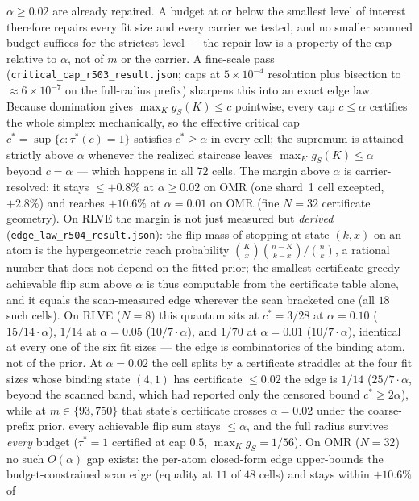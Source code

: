 \documentclass{article}
\theoremstyle{definition}
\theoremstyle{remark}
\begin{document}
$\alpha\ge0.02$ are already repaired. A budget at or below the
smallest level of interest therefore repairs every fit size and
every carrier we tested, and no smaller scanned budget suffices for
the strictest level --- the repair law is a property of the cap
relative to $\alpha$, not of $m$ or the carrier. A fine-scale pass
(\texttt{critical\_cap\_r503\_result.json}; caps at $5\times10^{-4}$
resolution plus bisection to ${\approx}6\times10^{-7}$ on the
full-radius prefix) sharpens this into an exact edge law. Because
domination gives $\max_K g_S(K)\le c$ pointwise, every cap
$c\le\alpha$ certifies the whole simplex mechanically, so the
effective critical cap $c^*=\sup\{c:\tau^*(c)=1\}$ satisfies
$c^*\ge\alpha$ in every cell; the supremum is attained strictly
above $\alpha$ whenever the realized staircase leaves
$\max_K g_S(K)\le\alpha$ beyond $c=\alpha$ --- which happens in all
$72$ cells. The margin above $\alpha$ is carrier-resolved: it stays
${\le}+0.8\%$ at $\alpha\ge0.02$ on OMR (one shard~1 cell excepted,
${+}2.8\%$) and reaches ${+}10.6\%$ at
$\alpha{=}0.01$ on OMR (fine $N{=}32$ certificate geometry). On RLVE
the margin is not just measured but \emph{derived}
(\texttt{edge\_law\_r504\_result.json}): the flip mass of stopping at
state $(k,x)$ on an atom is the hypergeometric reach probability
$\binom{K}{x}\binom{n-K}{k-x}/\binom{n}{k}$, a rational number that
does not depend on the fitted prior; the smallest certificate-greedy
achievable flip sum above $\alpha$ is thus computable from the
certificate table alone, and it equals the scan-measured edge wherever
the scan bracketed one (all $18$ such cells). On RLVE ($N{=}8$) this quantum
sits at $c^*{=}3/28$ at $\alpha{=}0.10$ ($15/14\cdot\alpha$), $1/14$
at $\alpha{=}0.05$ ($10/7\cdot\alpha$), and $1/70$ at
$\alpha{=}0.01$ ($10/7\cdot\alpha$), identical at every one of the six
fit sizes --- the edge is combinatorics of the binding atom, not of the
prior. At $\alpha{=}0.02$ the cell splits by a certificate straddle:
at the four fit sizes whose binding state $(4,1)$ has certificate
${\le}0.02$ the edge is $1/14$ ($25/7\cdot\alpha$, beyond the scanned
band, which had reported only the censored bound $c^*{\ge}2\alpha$),
while at $m\in\{93,750\}$ that state's certificate crosses
$\alpha{=}0.02$ under the coarse-prefix prior, every achievable flip
sum stays ${\le}\alpha$, and the full radius survives \emph{every}
budget ($\tau^*{=}1$ certified at cap $0.5$, $\max_K g_S{=}1/56$). On
OMR ($N{=}32$) no such $O(\alpha)$ gap exists: the per-atom
closed-form edge upper-bounds the budget-constrained scan edge
(equality at $11$ of $48$ cells) and stays within ${+}10.6\%$ of
\end{document}
